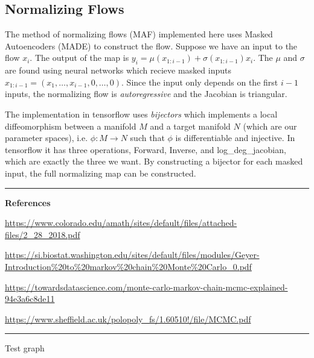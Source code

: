 \subsection{Normalizing Flows}
The method of normalizing flows (MAF) implemented here uses Masked Autoencoders (MADE) to construct the flow. Suppose we have an input to the flow $x_i$. The output of the map is $y_i= \mu(x_{1:i-1})+\sigma(x_{1:i-1})x_i$. The $\mu$ and $\sigma$ are found using neural networks which recieve masked inputs $x_{1:i-1}=(x_1,\ldots,x_{i-1},0,\ldots,0)$. Since the input only depends on the first $i-1$ inputs, the normalizing flow is \textit{autoregressive} and the Jacobian is triangular.

The implementation in tensorflow uses \textit{bijectors} which implements a local diffeomorphism between a manifold $M$ and a target manifold $N$ (which are our parameter spaces), i.e. $\phi:M\rightarrow N$ such that $\phi$ is differentiable and injective. In tensorflow it has three operations, Forward, Inverse, and log\_deg\_jacobian, which are exactly the three we want. By constructing a bijector for each masked input, the full normalizing map can be constructed.

\bigskip
\hrule
\textbf{\large References}

\url{https://www.colorado.edu/amath/sites/default/files/attached-files/2_28_2018.pdf}

\url{https://si.biostat.washington.edu/sites/default/files/modules/Geyer-Introduction\%20to\%20markov\%20chain\%20Monte\%20Carlo_0.pdf}

\url{https://towardsdatascience.com/monte-carlo-markov-chain-mcmc-explained-94e3a6c8de11}

\url{https://www.sheffield.ac.uk/polopoly_fs/1.60510!/file/MCMC.pdf}
\hrule

Test graph

